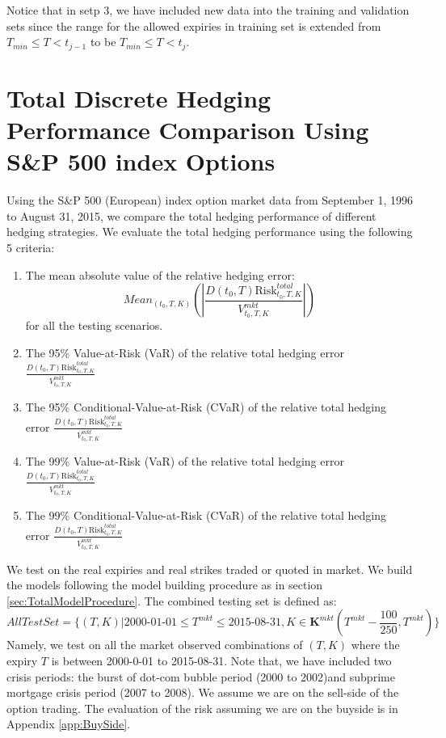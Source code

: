 \documentclass[letterpaper,12pt,titlepage,oneside,final]{book}
\numberwithin{equation}{section}
\theoremstyle{definition}
\newcommand{\Vmkt}{V^{mkt}}
\begin{document}
Notice that in setp 3, we have included new data into the training and validation sets since the range for the allowed expiries in training set is extended from $T_{min} \leq T<t_{j-1}$ to be $T_{min} \leq T<t_{j}$.
\section{Total Discrete Hedging Performance Comparison Using  S\&P 500 index Options} \label{sec:totalcriteria}
Using the S\&P 500  ({European})  index option market data from September 1, 1996 to August 31, 2015,
we  compare the total hedging performance of different hedging strategies.
We evaluate the total hedging performance using the following 5 criteria:
\begin{enumerate}
	\item The mean absolute value of the relative hedging error:
	\[
	Mean_{(t_0,T,K)}\left(\left|\frac{D(t_0,T)  \text{Risk}^{total}_{t_0,T,K}}{\Vmkt_{t_0,T,K}}\right|\right)
	\] for all the testing scenarios.
	\item The 95\% Value-at-Risk (VaR) of the relative total hedging error $\frac{D(t_0,T) \text{Risk}^{total}_{t_0,T,K}}{\Vmkt_{t_0,T,K}}$
	\item The 95\% Conditional-Value-at-Risk (CVaR) of the relative total hedging error $\frac{D(t_0,T) \text{Risk}^{total}_{t_0,T,K}}{\Vmkt_{t_0,T,K}}$
	\item The 99\% Value-at-Risk (VaR) of the relative total hedging error $\frac{D(t_0,T) \text{Risk}^{total}_{t_0,T,K}}{\Vmkt_{t_0,T,K}}$
	\item The 99\% Conditional-Value-at-Risk (CVaR) of the relative total hedging error $\frac{D(t_0,T) \text{Risk}^{total}_{t_0,T,K}}{\Vmkt_{t_0,T,K}}$
\end{enumerate}

We test on the real expiries and real strikes traded or quoted in market. We build the models following the model building procedure as in section \ref{sec:TotalModelProcedure}.  The combined testing set is defined as:
\[
AllTestSet=\{(T,K)|\text{2000-01-01}\leq T^{mkt} \leq \text{2015-08-31},K \in \mathbf{K}^{mkt}(T^{mkt}-\frac{100}{250},T^{mkt})\}
\]
Namely, we test on all the market observed combinations of $(T,K)$ where the expiry $T$ is between 2000-0-01 to 2015-08-31. Note that, we have included two crisis periods: the burst of dot-com bubble  period (2000 to 2002)and subprime mortgage crisis period (2007 to 2008). We assume we are on the sell-side of the option trading. The evaluation of the risk assuming we are on the buyside is in Appendix \ref{app:BuySide}.
\end{document}
